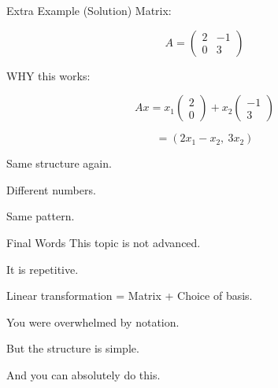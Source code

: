 \documentclass[aspectratio=169]{beamer}
\begin{document}
\begin{frame}{Extra Example (Solution)}
Matrix:

\[
A=
\begin{pmatrix}
2 & -1\\
0 & 3
\end{pmatrix}
\]

WHY this works:

\[
Ax=
x_1
\begin{pmatrix}2\\0\end{pmatrix}
+
x_2
\begin{pmatrix}-1\\3\end{pmatrix}
\]

\[
=
(2x_1-x_2,\ 3x_2)
\]

Same structure again.

Different numbers.

Same pattern.
\end{frame}

\begin{frame}{Final Words}
This topic is not advanced.

It is repetitive.

\bigskip

Linear transformation
=
Matrix
+
Choice of basis.

\bigskip

You were overwhelmed by notation.

But the structure is simple.

And you can absolutely do this.
\end{frame}
\end{document}
